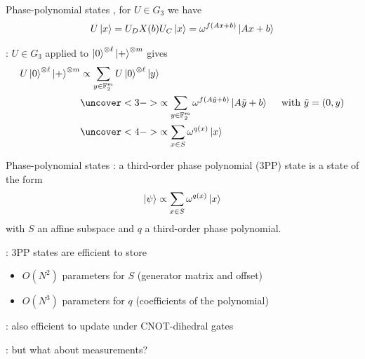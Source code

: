 \documentclass[aspectratio=169,11pt,t]{beamer}
\begin{document}
\begin{frame}{Phase-polynomial states}
  , for $U\in G_3$ we have
  \[
    U \ket{x} = U_D X(b) U_C \ket{x} = \omega^{f(Ax+b)} \ket{Ax+b}
  \]

  \pause
  : $U \in G_3$ applied to $\ket{0}^{\otimes \ell} \ket{+}^{\otimes m}$ gives
  \begin{align*}
    U\ket{0}^{\otimes \ell} \ket{+}^{\otimes m} &\propto \sum_{y\in \mathbb{F}_2^m} U \ket{0}^{\otimes \ell} \ket{y} \\
    & \uncover<3->{\propto \sum_{y\in \mathbb{F}_2^m} \omega^{f(A\tilde{y}+b)} \ket{A\tilde{y}+b} \quad \text{ with } \tilde{y} = (0, y)} \\
    & \uncover<4->{\propto \sum_{x \in S} \omega^{q(x)} \ket{x}}
  \end{align*}
\end{frame}

\begin{frame}{Phase-polynomial states}
  : a third-order phase polynomial (3PP) state is a state of the form
  \[
    \ket{\psi} \propto \sum_{x\in S} \omega^{q(x)} \ket{x}
  \]
  with $S$ an affine subspace and $q$ a third-order phase polynomial.

  \pause
  : 3PP states are efficient to store
  \begin{itemize}
    \item $O(N^2)$ parameters for $S$ (generator matrix and offset)
    \item $O(N^3)$ parameters for $q$ (coefficients of the polynomial)
  \end{itemize}

  \pause
  : also efficient to update under CNOT-dihedral gates

  \pause
  : but what about measurements?
\end{frame}

\end{document}
